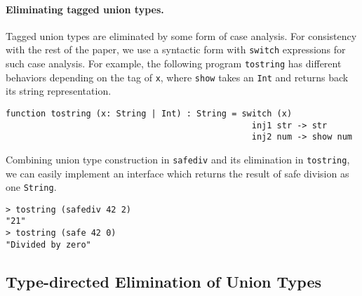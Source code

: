 \paragraph{Eliminating tagged union types.}
Tagged union types are eliminated by some form of case analysis.
For consistency with the rest of the paper, we use a syntactic form with
\lstinline{switch} expressions for such case analysis. For example,
the following program \lstinline{tostring} has different behaviors depending on the
tag of \lstinline{x}, where \lstinline{show} takes an \lstinline{Int} and
returns back its string representation.

\begin{lstlisting}
function tostring (x: String | Int) : String = switch (x)
                                                 inj1 str -> str
                                                 inj2 num -> show num
\end{lstlisting}

\noindent Combining union type construction in \lstinline{safediv} and its elimination in
\lstinline{tostring}, we can easily implement an interface which returns the
result of safe division as one \lstinline{String}.

\begin{lstlisting}
> tostring (safediv 42 2)
"21"
> tostring (safe 42 0)
"Divided by zero"
\end{lstlisting}


\subsection{Type-directed Elimination of Union Types}\label{subsec:elimination}






